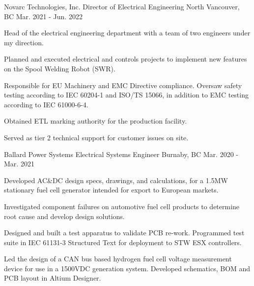 \begin{cventries}
    \cventry
    {Novarc Technologies, Inc.} %
    {Director of Electrical Engineering} %
    {North Vancouver, BC} %
    {Mar. 2021 - Jun. 2022} %
    { %
        \begin{cvitems}
            \item {Head of the electrical engineering department with a team of two engineers under my direction.}
            \item {Planned and executed electrical and controls projects to implement new features on the Spool Welding Robot (SWR).}
            \item {Responsible for EU Machinery and EMC Directive compliance. Oversaw safety testing according to IEC 60204-1 and ISO/TS 15066, in addition to EMC testing according to IEC 61000-6-4.}
            \item {Obtained ETL marking authority for the production facility.}
            \item {Served as tier 2 technical support for customer issues on site.}
        \end{cvitems}
    }

    \cventry
    {Ballard Power Systems} %
    {Electrical Systems Engineer} %
    {Burnaby, BC} %
    {Mar. 2020 - Mar. 2021} %
    { %
        \begin{cvitems}
            \item {Developed AC\&DC design specs, drawings, and calculations, for a 1.5MW stationary fuel cell generator intended for export to European markets.}
            \item {Investigated component failures on automotive fuel cell products to determine root cause and develop design solutions.}
            \item {Designed and built a test apparatus to validate PCB re-work. Programmed test suite in IEC 61131-3 Structured Text for deployment to STW ESX controllers.}
            \item {Led the design of a CAN bus based hydrogen fuel cell voltage measurement device for use in a 1500VDC generation system. Developed schematics, BOM and PCB layout in Altium Designer.}
        \end{cvitems}
    }


\end{cventries}
